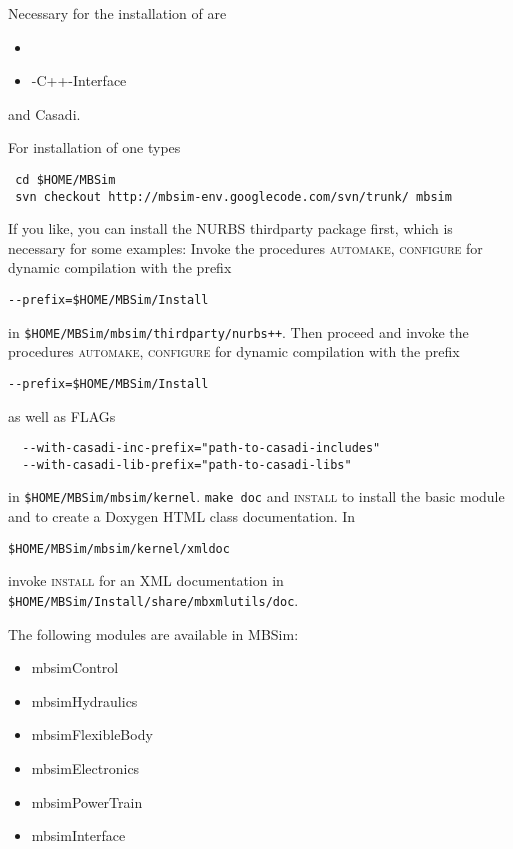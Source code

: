 \subsubsection{\MBSim}
Necessary for the installation of \MBSim{} are
\begin{itemize}
\item \FMatVec{}
\item \OpenMBV{}-C++-Interface
\end{itemize}
and Casadi.\par
%
For installation of \MBSim{} one types
\begin{verbatim}
 cd $HOME/MBSim
 svn checkout http://mbsim-env.googlecode.com/svn/trunk/ mbsim
\end{verbatim}
If you like, you can install the NURBS thirdparty package first, which is necessary for some examples: Invoke the procedures \textsc{automake, configure} for dynamic compilation with the prefix
\begin{verbatim}
--prefix=$HOME/MBSim/Install
\end{verbatim}
in \texttt{\$HOME/MBSim/mbsim/thirdparty/nurbs++}. Then proceed and invoke the procedures \textsc{automake, configure} for dynamic compilation with the prefix
\begin{verbatim}
--prefix=$HOME/MBSim/Install
\end{verbatim}
as well as FLAGs 
\begin{verbatim}
  --with-casadi-inc-prefix="path-to-casadi-includes"
  --with-casadi-lib-prefix="path-to-casadi-libs"
\end{verbatim}
in \texttt{\$HOME/MBSim/mbsim/kernel}. \texttt{make doc} and \textsc{install} to install the basic module and to create a Doxygen HTML class documentation. In
\begin{verbatim}
$HOME/MBSim/mbsim/kernel/xmldoc
\end{verbatim}
invoke \textsc{install} for an XML documentation in \texttt{\$HOME/MBSim/Install/share/mbxmlutils/doc}.\vspace{5mm}

The following modules are available in MBSim:
\begin{itemize}
\item mbsimControl
\item mbsimHydraulics
\item mbsimFlexibleBody
\item mbsimElectronics
\item mbsimPowerTrain
\item mbsimInterface
\end{itemize}

